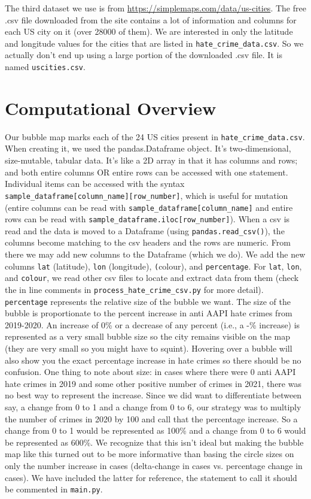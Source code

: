 \documentclass[fontsize=11pt]{article}
\begin{document}
The third dataset we use is from
\url{https://simplemaps.com/data/us-cities}. The free .csv file downloaded from the site contains a lot of information and columns for each US city on it (over 28000 of them). We are interested in only the latitude and longitude values for the cities that are listed in \texttt{hate\_crime\_data.csv}. So we actually don't end up using a large portion of the downloaded .csv file. It is named \texttt{uscities.csv}.

\section*{Computational Overview}

\quad Our bubble map marks each of the 24 US cities present in \texttt{hate\_crime\_data.csv}. When creating it, we used the pandas.Dataframe object. It's two-dimensional, size-mutable, tabular data. It's like a 2D array in that it has columns and rows; and both entire columns OR entire rows can be accessed with one statement. Individual items can be accessed with the syntax \texttt{sample\_dataframe[column\_name][row\_number]}, which is useful for mutation (entire columns can be read with \texttt{sample\_dataframe[column\_name]} and entire rows can be read with \texttt{sample\_dataframe.iloc[row\_number]}). When a csv is read and the data is moved to a Dataframe (using \texttt{pandas.read\_csv()}), the columns become matching to the csv headers and the rows are numeric. From there we may add new columns to the Dataframe (which we do). We add the new columns \texttt{lat} (latitude), \texttt{lon} (longitude), \texttt(colour), and \texttt{percentage}. For \texttt{lat}, \texttt{lon}, and \texttt{colour}, we read other csv files to locate and extract data from them (check the in line comments in \texttt{process\_hate\_crime\_csv.py} for more detail). \texttt{percentage} represents the relative size of the bubble we want. The size of the bubble is proportionate to the percent increase in anti AAPI hate crimes from 2019-2020. An increase of 0\% or a decrease of any percent (i.e., a -\% increase) is represented as a very small bubble size so the city remains visible on the map (they are very small so you might have to squint). Hovering over a bubble will also show you the exact percentage increase in hate crimes so there should be no confusion. One thing to note about size: in cases where there were 0 anti AAPI hate crimes in 2019 and some other positive number of crimes in 2021, there was no best way to represent the increase. Since we did want to differentiate between say, a change from 0 to 1 and a change from 0 to 6, our strategy was to multiply the number of crimes in 2020 by 100 and call that the percentage increase. So a change from 0 to 1 would be represented as 100\% and a change from 0 to 6 would be represented as 600\%. We recognize that this isn't ideal but making the bubble map like this turned out to be more informative than basing the circle sizes on only the number increase in cases (delta-change in cases vs. percentage change in cases). We have included the latter for reference, the statement to call it should be commented in \texttt{main.py}.
\end{document}
